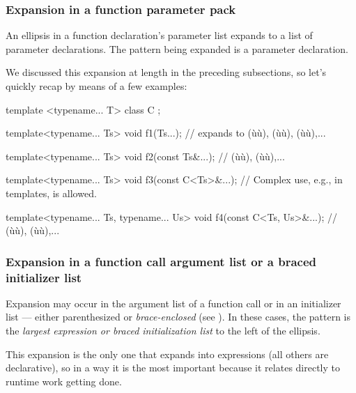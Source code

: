 \subsubsection[Expansion in a function parameter pack]{Expansion in a function parameter pack}\label{expansion-in-a-function-parameter-pack}

An ellipsis in a function declaration's parameter list expands to a list
of parameter declarations. The pattern being expanded is a parameter
declaration.

We discussed this expansion at length in the preceding subsections, so
let's quickly recap by means of a few examples:

\begin{emcppshiddenlisting}[emcppsbatch=e26]
template <typename... T> class C {};
\end{emcppshiddenlisting}
\begin{emcppslisting}[emcppsbatch=e26]
template<typename... Ts>
void f1(Ts...);                // expands to (ù{}ù), (ù{}ù), (ù{}ù),...

template<typename... Ts>
void f2(const Ts&...);         // (ù{}ù), (ù{}ù),...

template<typename... Ts>
void f3(const C<Ts>&...);      // Complex use, e.g., in templates, is allowed.

template<typename... Ts, typename... Us>
void f4(const C<Ts, Us>&...);  // (ù{}ù), (ù{}ù),...
\end{emcppslisting}
    

\subsubsection[Expansion in a function call argument list or a braced initializer list]{Expansion in a function call argument list or a braced initializer list}\label{expansion-in-a-function-call-argument-list-or-a-braced-initializer-list}

Expansion may occur in the argument list of a function call or in an
initializer list --- either parenthesized or \emph{brace-enclosed} (see
). In these cases, the pattern is the
\emph{largest expression or braced initialization list} to the left of
the ellipsis.

This expansion is the only one that expands into expressions (all others
are declarative), so in a way it is the most important because it
relates directly to runtime work getting done.

